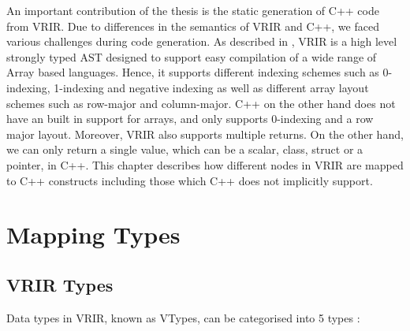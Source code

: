 An important contribution of the thesis is the static generation of C++ code from VRIR. Due to differences in the semantics of VRIR and C++, we faced various challenges during code generation. As described in , VRIR is a high level strongly typed AST designed to support easy compilation of a wide range of Array based languages. Hence, it supports different indexing schemes such as 0-indexing, 1-indexing and negative indexing as well as different array layout schemes such as row-major and column-major. C++ on the other hand does not have an built in support for arrays, and only supports 0-indexing and a row major layout. Moreover, VRIR also supports multiple returns. On the other hand, we can only return a single value, which can be a scalar, class, struct or a pointer, in C++. This chapter describes how different nodes in VRIR are mapped to C++ constructs including those which C++ does not implicitly support.
\section{Mapping Types}
\subsection{VRIR Types}
Data types in VRIR, known as VTypes, can be categorised into 5 types :
